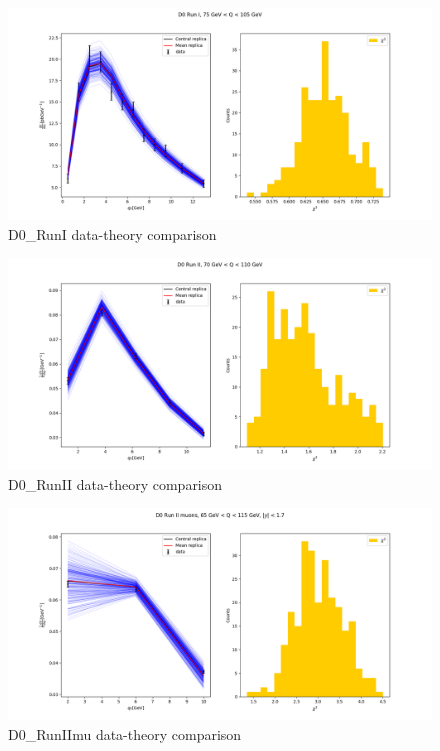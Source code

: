 \documentclass[
]{article}
\begin{document}
\begin{figure}
\centering
\includegraphics{pngplots/D0_RunI.png}
\caption{D0\_RunI data-theory comparison}
\end{figure}

\begin{figure}
\centering
\includegraphics{pngplots/D0_RunII.png}
\caption{D0\_RunII data-theory comparison}
\end{figure}

\begin{figure}
\centering
\includegraphics{pngplots/D0_RunIImu.png}
\caption{D0\_RunIImu data-theory comparison}
\end{figure}
\end{document}
